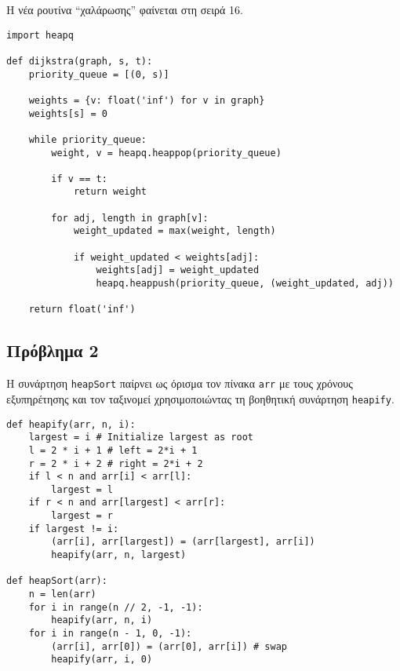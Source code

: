 \documentclass[12pt]{article}
\begin{document}
Η νέα ρουτίνα ``χαλάρωσης'' φαίνεται στη σειρά 16. 
\begin{verbatim}
import heapq

def dijkstra(graph, s, t):
    priority_queue = [(0, s)]  

    weights = {v: float('inf') for v in graph}
    weights[s] = 0

    while priority_queue:
        weight, v = heapq.heappop(priority_queue)

        if v == t:
            return weight

        for adj, length in graph[v]:
            weight_updated = max(weight, length)

            if weight_updated < weights[adj]:
                weights[adj] = weight_updated
                heapq.heappush(priority_queue, (weight_updated, adj))

    return float('inf') 
\end{verbatim}

\newpage 
\subsection*{Πρόβλημα 2}
Η συνάρτηση \texttt{heapSort} παίρνει ως όρισμα τον πίνακα \texttt{arr} με τους χρόνους εξυπηρέτησης και τον ταξινομεί χρησιμοποιώντας τη βοηθητική συνάρτηση \texttt{heapify}.
\begin{verbatim}
def heapify(arr, n, i):
	largest = i # Initialize largest as root
	l = 2 * i + 1 # left = 2*i + 1
	r = 2 * i + 2 # right = 2*i + 2
	if l < n and arr[i] < arr[l]:
		largest = l
	if r < n and arr[largest] < arr[r]:
		largest = r
	if largest != i:
		(arr[i], arr[largest]) = (arr[largest], arr[i])
		heapify(arr, n, largest)

def heapSort(arr):
	n = len(arr)
	for i in range(n // 2, -1, -1):
		heapify(arr, n, i)
	for i in range(n - 1, 0, -1):
		(arr[i], arr[0]) = (arr[0], arr[i]) # swap
		heapify(arr, i, 0)
\end{verbatim}

\newpage
\end{document}
